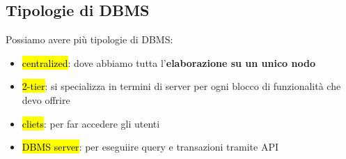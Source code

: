 \subsection{Tipologie di DBMS}

Possiamo avere più tipologie di DBMS:

\begin{itemize}
	\item \hl{centralized}: dove abbiamo tutta l'\textbf{elaborazione su un unico nodo}
	\item \hl{2-tier}: si specializza in termini di server per ogni blocco di funzionalità che devo offrire
	\item \hl{cliets}: per far accedere gli utenti
	\item \hl{DBMS server}: per eseguiire query e transazioni tramite API
\end{itemize}

